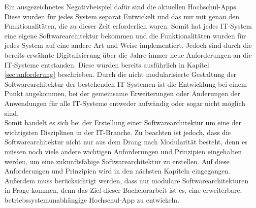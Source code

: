 Ein ausgezeichnetes Negativbeispiel dafür sind die aktuellen Hochschul-\acp{App}. Diese wurden für jedes System separat Entwickelt und das nur mit genau den Funktionalitäten, die zu dieser Zeit erforderlich waren. Somit hat jedes \ac{IT}-System eine eigene Softwarearchitektur bekommen und die Funktionalitäten wurden für jedes System auf eine andere Art und Weise implementiert. Jedoch sind durch die bereits erwähnte Digitalisierung über die Jahre immer neue Anforderungen an die \ac{IT}-Systeme entstanden. Diese wurden bereits ausführlich in Kapitel \ref{sec:anforderung} beschrieben. Durch die nicht modularisierte Gestaltung der Softwarearchitektur der bestehenden \ac{IT}-Systemen ist die Entwicklung bei einem Punkt angekommen, bei der gemeinsame Erweiterungen oder Änderungen der Anwendungen für alle \ac{IT}-Systeme entweder aufwändig oder sogar nicht möglich sind.
\\
\linebreak
Somit handelt es sich bei der Erstellung einer Softwarearchitektur um eine der wichtigsten Disziplinen in der \ac{IT}-Branche. Zu beachten ist jedoch, dass die Softwarearchitektur nicht nur aus dem Drang nach Modularität besteht, denn es müssen noch viele andere wichtigen Anforderungen und Prinzipien eingehalten werden, um eine zukunftsfähige Softwarearchitektur zu erstellen. Auf diese Anforderungen und Prinzipien wird in den nächsten Kapiteln eingegangen. Außerdem muss berücksichtigt werden, dass nur modulare Softwarearchitekturen in Frage kommen, denn das Ziel dieser Bachelorarbeit ist es, eine erweiterbare, betriebssystemunabhängige Hochschul-\ac{App} zu entwickeln.


